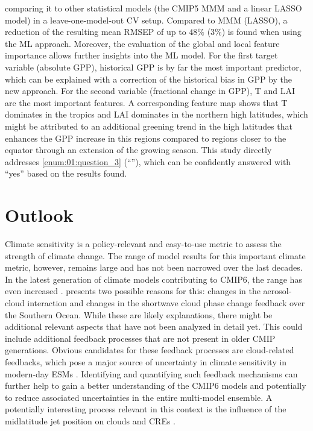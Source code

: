comparing it to other statistical models (the \acs{CMIP}5 \ac{MMM} and a linear
\ac{LASSO} model) in a leave-one-model-out \ac{CV} setup. Compared to \ac{MMM}
(\ac{LASSO}), a reduction of the resulting mean \ac{RMSEP} of up to $48
\unit{\%}$ ($3 \unit{\%}$) is found when using the \ac{ML} approach. Moreover,
the evaluation of the global and local feature importance allows further
insights into the \ac{ML} model. For the first target variable (absolute
\ac{GPP}), historical \ac{GPP} is by far the most important predictor, which
can be explained with a correction of the historical bias in \ac{GPP} by the
new approach. For the second variable (fractional change in \ac{GPP}), \ac{T}
and \ac{LAI} are the most important features. A corresponding feature map shows
that \ac{T} dominates in the tropics and \ac{LAI} dominates in the northern
high latitudes, which might be attributed to an additional greening trend in
the high latitudes that enhances the \ac{GPP} increase in this regions compared
to regions closer to the equator through an extension of the growing season.
This study directly addresses \cref{enum:01:question_3}
(\enquote{\emph{\KeyScienceQuestionThree{}}}), which can be confidently
answered with \enquote{yes} based on the results found.


\section{Outlook}
\label{sec:07:outlook}

Climate sensitivity is a policy-relevant and easy-to-use metric to assess the
strength of climate change. The range of model results for this important
climate metric, however, remains large and has not been narrowed over the last
decades. In the latest generation of climate models contributing to
\acs{CMIP}6, the range has even increased \autocite{Meehl2020}.
 presents two possible reasons for this:
changes in the aerosol-cloud interaction and changes in the shortwave cloud
phase change feedback over the Southern Ocean. While these are likely
explanations, there might be additional relevant aspects that have not been
analyzed in detail yet. This could include additional feedback processes that
are not present in older \ac{CMIP} generations. Obvious candidates for these
feedback processes are cloud-related feedbacks, which pose a major source of
uncertainty in climate sensitivity in modern-day \acp{ESM}
\autocite{Boucher2013}. Identifying and quantifying such feedback mechanisms
can further help to gain a better understanding of the \acs{CMIP}6 models and
potentially to reduce associated uncertainties in the entire multi-model
ensemble. A potentially interesting process relevant in this context is the
influence of the midlatitude jet position on clouds and \acp{CRE}
\autocite{Grise2016}.

